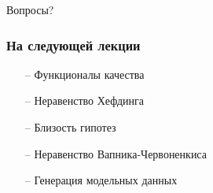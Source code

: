 \documentclass[10pt]{beamer}
\begin{document}
%
%
%
%
%

\begin{frame}[standout]
  Вопросы?
\end{frame}

\appendix

\begin{frame}\frametitle{На следующей лекции}
	\begin{itemize}
    	\item[--] Функционалы качества
    	\item[--] Неравенство Хефдинга
    	\item[--] Близость гипотез
    	\item[--] Неравенство Вапника-Червоненкиса
    	\item[--] Генерация модельных данных    	    	
	\end{itemize}
\end{frame}
\end{document}
